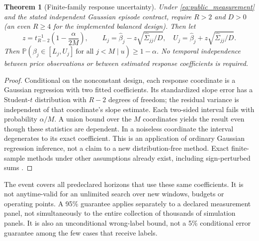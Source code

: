 \documentclass[10pt,twocolumn,letterpaper]{article}
\newtheorem{theorem}{Theorem}[section]
\theoremstyle{definition}
\theoremstyle{remark}
\begin{document}
\begin{theorem}[Finite-family response uncertainty]
\label{thm:observable_ci}
Under \eqref{eq:public_measurement} and the stated independent Gaussian episode contract, require $R>2$ and $D>0$ (an even $R\ge4$ for the implemented balanced design). Then let
\[
 z=t_{R-2}^{-1}\!\left(1-\frac{\alpha}{2M}\right),\qquad
 L_j=\widehat\beta_j-z\sqrt{\widehat\Sigma_{jj}/D},\quad
 U_j=\widehat\beta_j+z\sqrt{\widehat\Sigma_{jj}/D}.
\]
Then $\mathbb P(\beta_j\in[L_j,U_j]\ \text{for all }j<M\mid u)\ge1-\alpha$. No temporal independence between price observations or between estimated response coefficients is required.
\end{theorem}
\begin{proof}
Conditional on the nonconstant design, each response coordinate is a Gaussian regression with two fitted coefficients. Its standardized slope error has a Student-$t$ distribution with $R-2$ degrees of freedom; the residual variance is independent of that coordinate's slope estimate. Each two-sided interval fails with probability $\alpha/M$. A union bound over the $M$ coordinates yields the result even though these statistics are dependent. In a noiseless coordinate the interval degenerates to its exact coefficient. This is an application of ordinary Gaussian regression inference, not a claim to a new distribution-free method. Exact finite-sample methods under other assumptions already exist, including sign-perturbed sums \citep{csaji2015}.
\end{proof}

The event covers all predeclared horizons that use these same coefficients. It is not anytime-valid for an unlimited search over new windows, budgets or operating points. A 95\% guarantee applies separately to a declared measurement panel, not simultaneously to the entire collection of thousands of simulation panels. It is also an unconditional wrong-label bound, not a 5\% conditional error guarantee among the few cases that receive labels.
\end{document}

